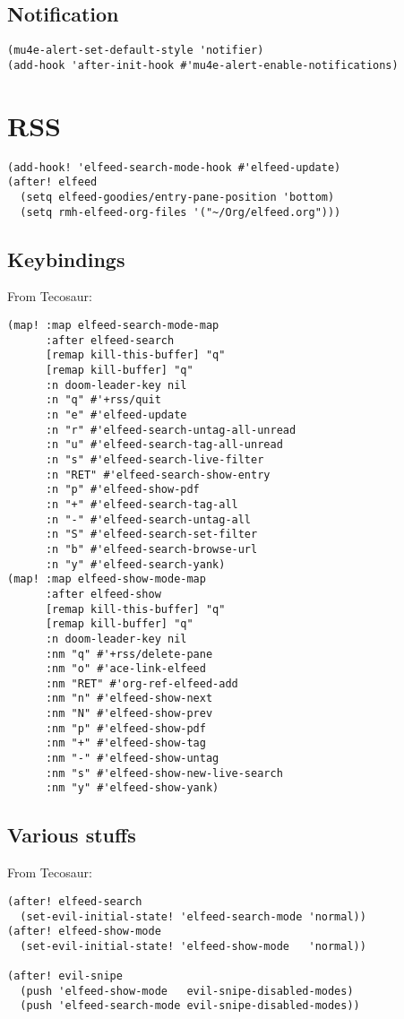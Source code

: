 \documentclass[c]{article}
\theoremstyle{plain}%
\theoremstyle{definition}
\theoremstyle{remark}
\begin{document}
\subsection{Notification}
\label{sec:orgf5f7724}
\begin{verbatim}
(mu4e-alert-set-default-style 'notifier)
(add-hook 'after-init-hook #'mu4e-alert-enable-notifications)
\end{verbatim}
\section{RSS}
\label{sec:org85f0756}
\begin{verbatim}
(add-hook! 'elfeed-search-mode-hook #'elfeed-update)
(after! elfeed
  (setq elfeed-goodies/entry-pane-position 'bottom)
  (setq rmh-elfeed-org-files '("~/Org/elfeed.org")))
\end{verbatim}
\subsection{Keybindings}
\label{sec:org75e431f}
From Tecosaur:
\begin{verbatim}
(map! :map elfeed-search-mode-map
      :after elfeed-search
      [remap kill-this-buffer] "q"
      [remap kill-buffer] "q"
      :n doom-leader-key nil
      :n "q" #'+rss/quit
      :n "e" #'elfeed-update
      :n "r" #'elfeed-search-untag-all-unread
      :n "u" #'elfeed-search-tag-all-unread
      :n "s" #'elfeed-search-live-filter
      :n "RET" #'elfeed-search-show-entry
      :n "p" #'elfeed-show-pdf
      :n "+" #'elfeed-search-tag-all
      :n "-" #'elfeed-search-untag-all
      :n "S" #'elfeed-search-set-filter
      :n "b" #'elfeed-search-browse-url
      :n "y" #'elfeed-search-yank)
(map! :map elfeed-show-mode-map
      :after elfeed-show
      [remap kill-this-buffer] "q"
      [remap kill-buffer] "q"
      :n doom-leader-key nil
      :nm "q" #'+rss/delete-pane
      :nm "o" #'ace-link-elfeed
      :nm "RET" #'org-ref-elfeed-add
      :nm "n" #'elfeed-show-next
      :nm "N" #'elfeed-show-prev
      :nm "p" #'elfeed-show-pdf
      :nm "+" #'elfeed-show-tag
      :nm "-" #'elfeed-show-untag
      :nm "s" #'elfeed-show-new-live-search
      :nm "y" #'elfeed-show-yank)
\end{verbatim}
\subsection{Various stuffs}
\label{sec:orgd05b021}
From Tecosaur:
\begin{verbatim}
(after! elfeed-search
  (set-evil-initial-state! 'elfeed-search-mode 'normal))
(after! elfeed-show-mode
  (set-evil-initial-state! 'elfeed-show-mode   'normal))

(after! evil-snipe
  (push 'elfeed-show-mode   evil-snipe-disabled-modes)
  (push 'elfeed-search-mode evil-snipe-disabled-modes))
\end{verbatim}
\end{document}
